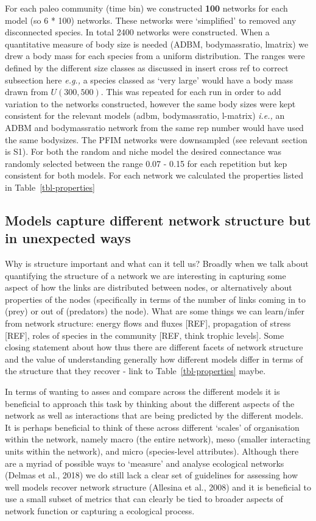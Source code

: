 \documentclass[
]{article}
\begin{document}
For each paleo community (time bin) we constructed \textbf{100} networks
for each model (so 6 * 100) networks. These networks were `simplified'
to removed any disconnected species. In total 2400 networks were
constructed. When a quantitative measure of body size is needed (ADBM,
bodymassratio, lmatrix) we drew a body mass for each species from a
uniform distribution. The ranges were defined by the different size
classes as discussed in insert cross ref to correct subsection here
\emph{e.g.,} a species classed as `very large' would have a body mass
drawn from \(U(300, 500)\). This was repeated for each run in order to
add variation to the networks constructed, however the same body sizes
were kept consistent for the relevant models (adbm, bodymassratio,
l-matrix) \emph{i.e.,} an ADBM and bodymassratio network from the same
rep number would have used the same bodysizes. The PFIM networks were
downsampled (see relevant section is S1). For both the random and niche
model the desired connectance was randomly selected between the range
0.07 - 0.15 for each repetition but kep consistent for both models. For
each network we calculated the properties listed in
Table~\ref{tbl-properties}

\subsection{Models capture different network structure but in unexpected
ways}\label{models-capture-different-network-structure-but-in-unexpected-ways}

Why is structure important and what can it tell us? Broadly when we talk
about quantifying the structure of a network we are interesting in
capturing some aspect of how the links are distributed between nodes, or
alternatively about properties of the nodes (specifically in terms of
the number of links coming in to (prey) or out of (predators) the node).
What are some things we can learn/infer from network structure: energy
flows and fluxes {[}REF{]}, propagation of stress {[}REF{]}, roles of
species in the community {[}REF, think trophic levels{]}. Some closing
statement about how thus there are different facets of network structure
and the value of understanding generally how different models differ in
terms of the structure that they recover - link to
Table~\ref{tbl-properties} maybe.

In terms of wanting to asses and compare across the different models it
is beneficial to approach this task by thinking about the different
aspects of the network as well as interactions that are being predicted
by the different models. It is perhaps beneficial to think of these
across different `scales' of organisation within the network, namely
macro (the entire network), meso (smaller interacting units within the
network), and micro (species-level attributes). Although there are a
myriad of possible ways to `measure' and analyse ecological networks
(Delmas et al., 2018) we do still lack a clear set of guidelines for
assessing how well models recover network structure (Allesina et al.,
2008) and it is beneficial to use a small subset of metrics that can
clearly be tied to broader aspects of network function or capturing a
ecological process.
\end{document}
